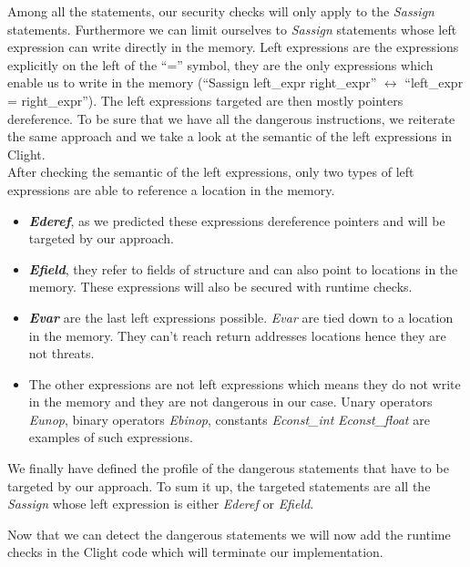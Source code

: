 \documentclass[11pt]{sdm}
\begin{document}
Among all the statements, our security checks will only apply to the \textit{Sassign} statements.
Furthermore we can limit ourselves to \textit{Sassign} statements whose left expression can write directly in the memory. Left expressions are the expressions explicitly on the left of the ``='' symbol, they are the only expressions which enable us to write in the memory (``Sassign left\_expr right\_expr'' $\leftrightarrow$ ``left\_expr = right\_expr''). The left expressions targeted are then mostly pointers dereference. To be sure that we have all the dangerous instructions, we reiterate the same approach and we take a look at the semantic of the left expressions in Clight.\\
After checking the semantic of the left expressions, only two types of left expressions are able to reference a location in the memory.

\begin{itemize}
	\item \textbf{\textit{Ederef}}, as we predicted these expressions dereference pointers and will be targeted by our approach.
	\item \textbf{\textit{Efield}}, they refer to fields of structure and can also point to locations in the memory. These expressions will also be secured with runtime checks.
	\item \textbf{\textit{Evar}} are the last left expressions possible. \textit{Evar} are tied down to a location in the memory. They can't reach return addresses locations hence they are not threats.
	\item The other expressions are not left expressions which means they do not write in the memory and they are not dangerous in our case. Unary operators \textit{Eunop}, binary operators \textit{Ebinop}, constants \textit{Econst\_int} \textit{Econst\_float} are examples of such expressions.
\end{itemize}

We finally have defined the profile of the dangerous statements that have to be targeted by our approach. To sum it up, the targeted statements are all the \textit{Sassign} whose left expression is either \textit{Ederef} or \textit{Efield}.

Now that we can detect the dangerous statements we will now add the runtime checks in the Clight code which will terminate our implementation.
\end{document}
